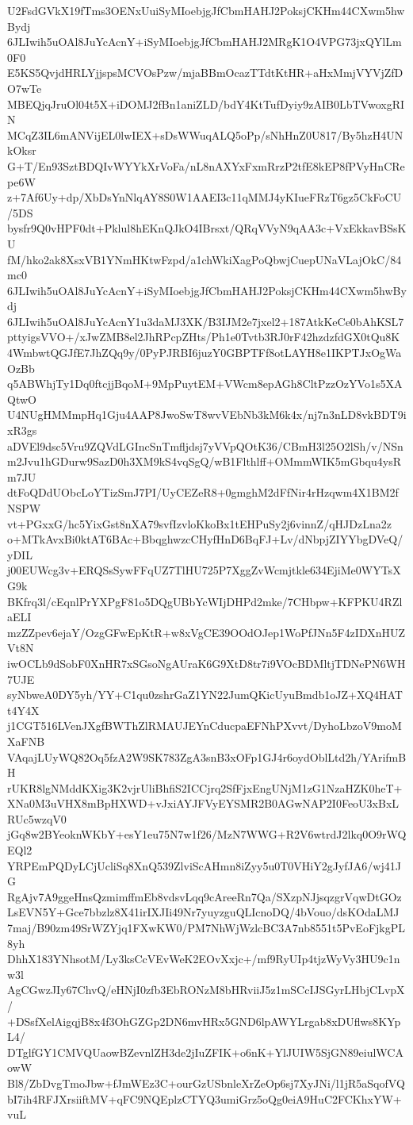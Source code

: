 U2FsdGVkX19fTms3OENxUuiSyMIoebjgJfCbmHAHJ2PoksjCKHm44CXwm5hwBydj
6JLIwih5uOAl8JuYcAcnY+iSyMIoebjgJfCbmHAHJ2MRgK1O4VPG73jxQYlLm0F0
E5KS5QvjdHRLYjjspsMCVOsPzw/mjaBBmOcazTTdtKtHR+aHxMmjVYVjZfDO7wTe
MBEQjqJruOl04t5X+iDOMJ2fBn1aniZLD/bdY4KtTufDyiy9zAIB0LbTVwoxgRIN
MCqZ3IL6mANVijEL0lwIEX+sDsWWuqALQ5oPp/sNhHnZ0U817/By5hzH4UNkOksr
G+T/En93SztBDQIvWYYkXrVoFa/nL8nAXYxFxmRrzP2tfE8kEP8fPVyHnCRepe6W
z+7Af6Uy+dp/XbDsYnNlqAY8S0W1AAEI3c11qMMJ4yKIueFRzT6gz5CkFoCU/5DS
bysfr9Q0vHPF0dt+Pklul8hEKnQJkO4IBrsxt/QRqVVyN9qAA3c+VxEkkavBSsKU
fM/hko2ak8XsxVB1YNmHKtwFzpd/a1chWkiXagPoQbwjCuepUNaVLajOkC/84mc0
6JLIwih5uOAl8JuYcAcnY+iSyMIoebjgJfCbmHAHJ2PoksjCKHm44CXwm5hwBydj
6JLIwih5uOAl8JuYcAcnY1u3daMJ3XK/B3IJM2e7jxel2+187AtkKeCe0bAhKSL7
pttyigsVVO+/xJwZMB8el2JhRPcpZHts/Ph1e0Tvtb3RJ0rF42hzdzfdGX0tQu8K
4WmbwtQGJfE7JhZQq9y/0PyPJRBI6juzY0GBPTFf8otLAYH8e1IKPTJxOgWaOzBb
q5ABWhjTy1Dq0ftcjjBqoM+9MpPuytEM+VWcm8epAGh8CltPzzOzYVo1s5XAQtwO
U4NUgHMMmpHq1Gju4AAP8JwoSwT8wvVEbNb3kM6k4x/nj7n3nLD8vkBDT9ixR3gs
aDVEl9dsc5Vru9ZQVdLGIncSnTmfljdsj7yVVpQOtK36/CBmH3l25O2lSh/v/NSn
m2Jvu1hGDurw9SazD0h3XM9kS4vqSgQ/wB1Flthlff+OMmmWIK5mGbqu4ysRm7JU
dtFoQDdUObcLoYTizSmJ7PI/UyCEZeR8+0gmghM2dFfNir4rHzqwm4X1BM2fNSPW
vt+PGxxG/hc5YixGst8nXA79svfIzvloKkoBx1tEHPuSy2j6vinnZ/qHJDzLna2z
o+MTkAvxBi0ktAT6BAc+BbqghwzcCHyfHnD6BqFJ+Lv/dNbpjZIYYbgDVeQ/yDIL
j00EUWcg3v+ERQSsSywFFqUZ7TlHU725P7XggZvWcmjtkle634EjiMe0WYTsXG9k
BKfrq3l/cEqnlPrYXPgF81o5DQgUBbYcWIjDHPd2mke/7CHbpw+KFPKU4RZlaELI
mzZZpev6ejaY/OzgGFwEpKtR+w8xVgCE39OOdOJep1WoPfJNn5F4zIDXnHUZVt8N
iwOCLb9dSobF0XnHR7xSGsoNgAUraK6G9XtD8tr7i9VOcBDMltjTDNePN6WH7UJE
syNbweA0DY5yh/YY+C1qu0zshrGaZ1YN22JumQKicUyuBmdb1oJZ+XQ4HATt4Y4X
j1CGT516LVenJXgfBWThZlRMAUJEYnCducpaEFNhPXvvt/DyhoLbzoV9moMXaFNB
VAqajLUyWQ82Oq5fzA2W9SK783ZgA3snB3xOFp1GJ4r6oydOblLtd2h/YArifmBH
rUKR8lgNMddKXig3K2vjrUliBhfiS2ICCjrq2SfFjxEngUNjM1zG1NzaHZK0heT+
XNa0M3uVHX8mBpHXWD+vJxiAYJFVyEYSMR2B0AGwNAP2I0FeoU3xBxLRUc5wzqV0
jGq8w2BYeoknWKbY+esY1eu75N7w1f26/MzN7WWG+R2V6wtrdJ2lkq0O9rWQEQl2
YRPEmPQDyLCjUcliSq8XnQ539ZlviScAHmn8iZyy5u0T0VHiY2gJyfJA6/wj41JG
RgAjv7A9ggeHnsQzmimffmEb8vdsvLqq9cAreeRn7Qa/SXzpNJjsqzgrVqwDtGOz
LsEVN5Y+Gce7bbzlz8X41irIXJIi49Nr7yuyzguQLIcnoDQ/4bVouo/dsKOdaLMJ
7maj/B90zm49SrWZYjq1FXwKW0/PM7NhWjWzlcBC3A7nb8551t5PvEoFjkgPL8yh
DhhX183YNhsotM/Ly3ksCcVEvWeK2EOvXxjc+/mf9RyUIp4tjzWyVy3HU9c1nw3l
AgCGwzJIy67ChvQ/eHNjI0zfb3EbRONzM8bHRviiJ5z1mSCcIJSGyrLHbjCLvpX/
+DSsfXelAigqjB8x4f3OhGZGp2DN6mvHRx5GND6lpAWYLrgab8xDUflws8KYpL4/
DTglfGY1CMVQUaowBZevnlZH3de2jIuZFIK+o6nK+YlJUIW5SjGN89eiulWCAowW
Bl8/ZbDvgTmoJbw+fJmWEz3C+ourGzUSbnleXrZeOp6sj7XyJNi/l1jR5aSqofVQ
bI7ih4RFJXrsiiftMV+qFC9NQEplzCTYQ3umiGrz5oQg0eiA9HuC2FCKhxYW+vuL
